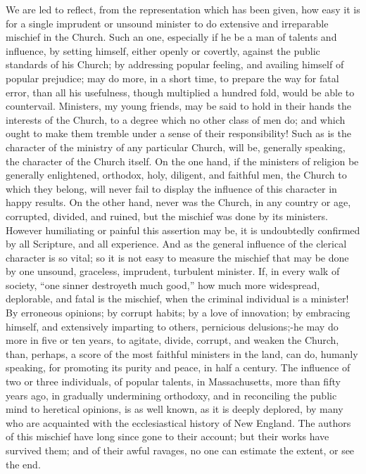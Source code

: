\documentclass[
]{book}
\begin{document}
We are led to reflect, from the representation which has been given, how easy it is for a single imprudent or unsound minister to do extensive and irreparable mischief in the Church. Such an one, especially if he be a man of talents and influence, by setting himself, either openly or covertly, against the public standards of his Church; by addressing popular feeling, and availing himself of popular prejudice; may do more, in a short time, to prepare the way for fatal error, than all his usefulness, though multiplied a hundred fold, would be able to countervail. Ministers, my young friends, may be said to hold in their hands the interests of the Church, to a degree which no other class of men do; and which ought to make them tremble under a sense of their responsibility! Such as is the character of the ministry of any particular Church, will be, generally speaking, the character of the Church itself. On the one hand, if the ministers of religion be generally enlightened, orthodox, holy, diligent, and faithful men, the Church to which they belong, will never fail to display the influence of this character in happy results. On the other hand, never was the Church, in any country or age, corrupted, divided, and ruined, but the mischief was done by its ministers. However humiliating or painful this assertion may be, it is undoubtedly confirmed by all Scripture, and all experience. And as the general influence of the clerical character is so vital; so it is not easy to measure the mischief that may be done by one unsound, graceless, imprudent, turbulent minister. If, in every walk of society, ``one sinner destroyeth much good,'' how much more widespread, deplorable, and fatal is the mischief, when the criminal individual is a minister! By erroneous opinions; by corrupt habits; by a love of innovation; by embracing himself, and extensively imparting to others, pernicious delusions;-he may do more in five or ten years, to agitate, divide, corrupt, and weaken the Church, than, perhaps, a score of the most faithful ministers in the land, can do, humanly speaking, for promoting its purity and peace, in half a century. The influence of two or three individuals, of popular talents, in Massachusetts, more than fifty years ago, in gradually undermining orthodoxy, and in reconciling the public mind to heretical opinions, is as well known, as it is deeply deplored, by many who are acquainted with the ecclesiastical history of New England. The authors of this mischief have long since gone to their account; but their works have survived them; and of their awful ravages, no one can estimate the extent, or see the end.
\end{document}
